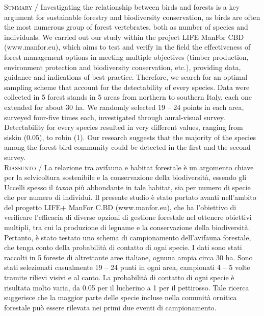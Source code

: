 {\small
\noindent \textsc{\color{MUSEBLUE} Summary} / Investigating the relationship between birds and forests is a key
argument for sustainable forestry and biodiversity conservation, as
birds are often the most numerous group of forest vertebrates, both as
number of species and individuals. We carried out our study within the
project LIFE ManFor CBD (www.manfor.eu), which aims to test and verify
in the field the effectiveness of forest management options in meeting
multiple objectives (timber production, environment protection and
biodiversity conservation, etc.), providing data, guidance and
indications of best-practice. Therefore, we search for an optimal
sampling scheme that account for the detectability of every species.
Data were collected in 5 forest stands in 5 areas from northern to
southern Italy, each one extended for about 30 ha. We randomly selected
19 -- 24 points in each area, surveyed four-five times each,
investigated through aural-visual survey. Detectability for every
species resulted in very different values, ranging from siskin (0.05),
to robin (1). Our research suggests that the majority of the species
among the forest bird community could be detected in the first and the
second survey.   \\
\noindent \textsc{\color{MUSEBLUE} Riassunto} / La relazione tra avifauna e habitat forestale \`e un argomento chiave
per la selvicoltura sostenibile e la conservazione della
biodiversit\`a, essendo gli Uccelli spesso il \textit{taxon} pi\`u
abbondante in tale habitat, sia per numero di specie che per numero di
individui. Il presente studio \`e stato portato avanti
nell{\textquoteright}ambito del progetto LIFE+ ManFor C.BD
(www.manfor.eu), che ha l{\textquoteright}obiettivo di verificare
l{\textquoteright}efficacia di diverse opzioni di gestione forestale
nel ottenere obiettivi multipli, tra cui la produzione di legname e la
conservazione della biodiversit\`a. Pertanto, \`e stato testato uno
schema di campionamento dell{\textquoteright}avifauna forestale, che
tenga conto della probabilit\`a di contatto di ogni specie. I dati sono
stati raccolti in 5 foreste di altrettante aree italiane, ognuna ampia
circa 30 ha. Sono stati selezionati casualmente 19 -- 24 punti in ogni
area, campionati 4 -- 5 volte tramite rilievi visivi e al canto. La
probabilit\`a di contatto di ogni specie \`e risultata molto varia, da
0.05 per il  lucherino a 1 per il pettirosso. Tale ricerca suggerisce
che la maggior parte delle specie incluse nella comunit\`a ornitica
forestale pu\`o essere rilevata nei primi due eventi di campionamento. \\
}
